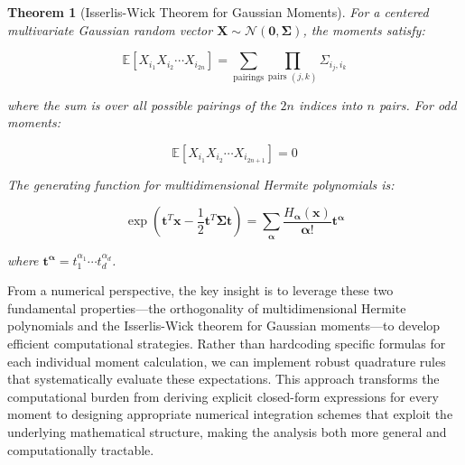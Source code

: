 \documentclass[a4paper]{article}
\theoremstyle{plain}
\newtheorem{theorem}{Theorem}[section]
\theoremstyle{definition}
\theoremstyle{remark}
\begin{document}
\begin{theorem}[Isserlis-Wick Theorem for Gaussian Moments]
\label{thm:isserlis_wick}
For a centered multivariate Gaussian random vector $\mathbf{X} \sim \mathcal{N}(\mathbf{0}, \boldsymbol{\Sigma})$, the moments satisfy:

\begin{equation}
\boxed{\mathbb{E}[X_{i_1} X_{i_2} \cdots X_{i_{2n}}] = \sum_{\text{pairings}} \prod_{\text{pairs } (j,k)} \Sigma_{i_j, i_k}} \label{eq:isserlis_wick_formula}
\end{equation}

where the sum is over all possible pairings of the $2n$ indices into $n$ pairs. For odd moments:

\begin{equation}
\boxed{\mathbb{E}[X_{i_1} X_{i_2} \cdots X_{i_{2n+1}}] = 0} \label{eq:odd_moments_zero}
\end{equation}

The generating function for multidimensional Hermite polynomials is:

\begin{equation}
\boxed{\exp\left(\mathbf{t}^T \mathbf{x} - \frac{1}{2}\mathbf{t}^T \boldsymbol{\Sigma} \mathbf{t}\right) = \sum_{\boldsymbol{\alpha}} \frac{H_{\boldsymbol{\alpha}}(\mathbf{x})}{\boldsymbol{\alpha}!} \mathbf{t}^{\boldsymbol{\alpha}}} \label{eq:multidim_generating_function}
\end{equation}

where $\mathbf{t}^{\boldsymbol{\alpha}} = t_1^{\alpha_1} \cdots t_d^{\alpha_d}$.
\end{theorem}
\begin{tcolorbox}[colback=green!5,colframe=green!80!black,title={\textbf{Numerical Implementation Strategy}},enhanced,drop shadow,boxrule=2pt]
From a numerical perspective, the key insight is to leverage these two fundamental properties—the orthogonality of multidimensional Hermite polynomials and the Isserlis-Wick theorem for Gaussian moments—to develop efficient computational strategies. Rather than hardcoding specific formulas for each individual moment calculation, we can implement robust quadrature rules that systematically evaluate these expectations. This approach transforms the computational burden from deriving explicit closed-form expressions for every moment to designing appropriate numerical integration schemes that exploit the underlying mathematical structure, making the analysis both more general and computationally tractable.
\end{tcolorbox}
\end{document}
